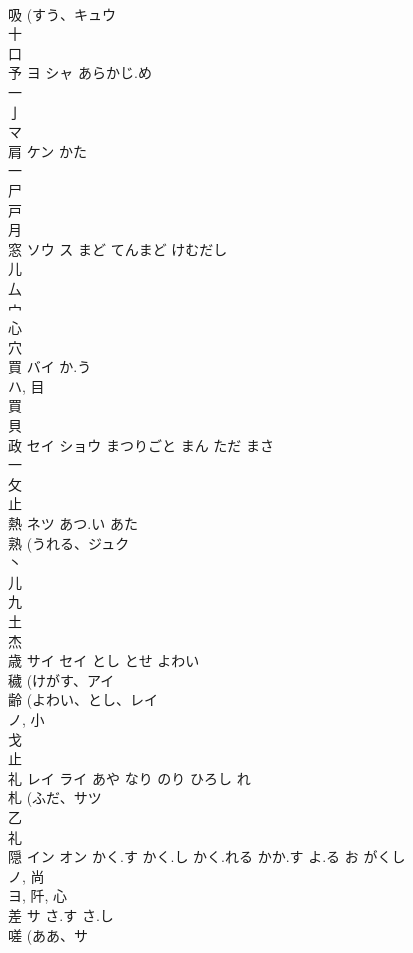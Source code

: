 \documentclass[8pt]{extreport}
\begin{document}
\begin{CJK}{UTF8}{min}
\\	吸 (すう、キュウ 
\\	十 
\\	口 
\\	予	ヨ シャ	あらかじ.め	
\\	一 
\\	亅 
\\	マ	
\\	肩	ケン	かた	
\\	一 
\\	尸 
\\	戸 
\\	月 
\\	窓	ソウ ス	まど てんまど けむだし	
\\	儿 
\\	厶 
\\	宀 
\\	心 
\\	穴 
\\	買	バイ	か.う	
\\	ハ, 目 
\\	買 
\\	貝 
\\	政	セイ ショウ	まつりごと まん ただ まさ	
\\	一 
\\	攵 
\\	止 
\\	熱	ネツ	あつ.い あた	
\\	熟 (うれる、ジュク 
\\	丶 
\\	儿 
\\	九 
\\	土 
\\	杰	
\\	歳	サイ セイ	とし とせ よわい	
\\	穢 (けがす、アイ 
\\	齢 (よわい、とし、レイ 
\\	ノ, 小 
\\	戈 
\\	止 
\\	礼	レイ ライ	あや なり のり ひろし れ	
\\	札 (ふだ、サツ 
\\	乙 
\\	礼 
\\	隠	イン オン	かく.す かく.し かく.れる かか.す よ.る お がくし	
\\	ノ, 尚 
\\	ヨ, 阡, 心 
\\	差	サ	さ.す さ.し	
\\	嗟 (ああ、サ 

\end{CJK}
\end{document}
